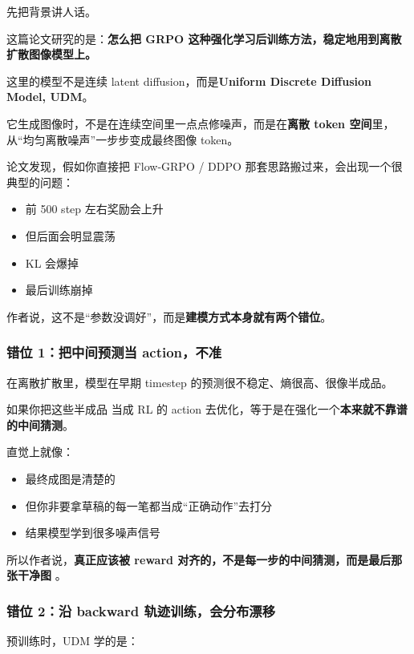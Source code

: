 先把背景讲人话。

这篇论文研究的是：\textbf{怎么把 GRPO 这种强化学习后训练方法，稳定地用到离散扩散图像模型上。}

这里的模型不是连续 latent diffusion，而是\textbf{Uniform Discrete Diffusion Model, UDM}。

它生成图像时，不是在连续空间里一点点修噪声，而是在\textbf{离散 token 空间}里，从“均匀离散噪声”一步步变成最终图像 token。

论文发现，假如你直接把 Flow-GRPO / DDPO 那套思路搬过来，会出现一个很典型的问题：

\begin{itemize}[leftmargin=1.5em]
  \item 前 500 step 左右奖励会上升
  \item 但后面会明显震荡
  \item KL 会爆掉
  \item 最后训练崩掉
\end{itemize}

作者说，这不是“参数没调好”，而是\textbf{建模方式本身就有两个错位}。

\subsubsection{错位 1：把中间预测当 action，不准}

在离散扩散里，模型在早期 timestep 的预测很不稳定、熵很高、很像半成品。

如果你把这些半成品  当成 RL 的 action 去优化，等于是在强化一个\textbf{本来就不靠谱的中间猜测}。

直觉上就像：

\begin{itemize}[leftmargin=1.5em]
  \item 最终成图是清楚的
  \item 但你非要拿草稿的每一笔都当成“正确动作”去打分
  \item 结果模型学到很多噪声信号
\end{itemize}

所以作者说，\textbf{真正应该被 reward 对齐的，不是每一步的中间猜测，而是最后那张干净图 }。

\subsubsection{错位 2：沿 backward 轨迹训练，会分布漂移}

预训练时，UDM 学的是：


